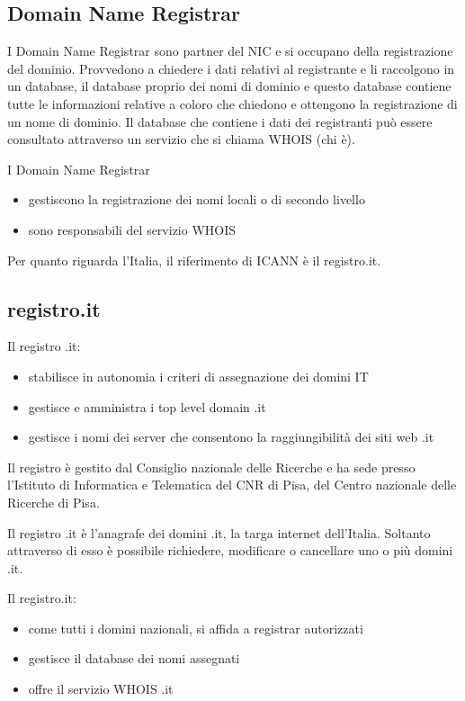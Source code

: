 \subsection{Domain Name Registrar}
I Domain Name Registrar sono partner del NIC e si occupano della registrazione del dominio.
Provvedono a chiedere i dati relativi al registrante e li raccolgono in un database, il database proprio dei nomi di dominio e questo database contiene tutte le informazioni relative a coloro che chiedono e ottengono la registrazione di un nome di dominio. Il database che contiene i dati dei registranti può essere consultato attraverso un servizio che si chiama WHOIS (chi è).

I Domain Name Registrar

\begin{itemize}
    \item gestiscono la registrazione dei nomi locali o di secondo livello
    \item sono responsabili del servizio WHOIS
\end{itemize}{}

Per quanto riguarda l'Italia, il riferimento di ICANN è il registro.it.

\subsection{registro.it}
Il registro .it:
\begin{itemize}
    \item stabilisce in autonomia i criteri di assegnazione dei domini IT
    \item gestisce e amministra i top level domain .it
    \item gestisce i nomi dei server che consentono la raggiungibilità dei siti web .it
\end{itemize}

Il registro è gestito dal Consiglio nazionale delle Ricerche e ha sede presso l'Istituto di Informatica e Telematica del CNR di Pisa, del Centro nazionale delle Ricerche di Pisa.

Il registro .it è l'anagrafe dei domini .it, la targa internet dell'Italia. Soltanto attraverso di esso è possibile richiedere, modificare o cancellare uno o più domini .it.

Il registro.it:
\begin{itemize}
    \item come tutti i domini nazionali, si affida a registrar autorizzati
    \item gestisce il database dei nomi assegnati
    \item offre il servizio WHOIS .it
\end{itemize}

